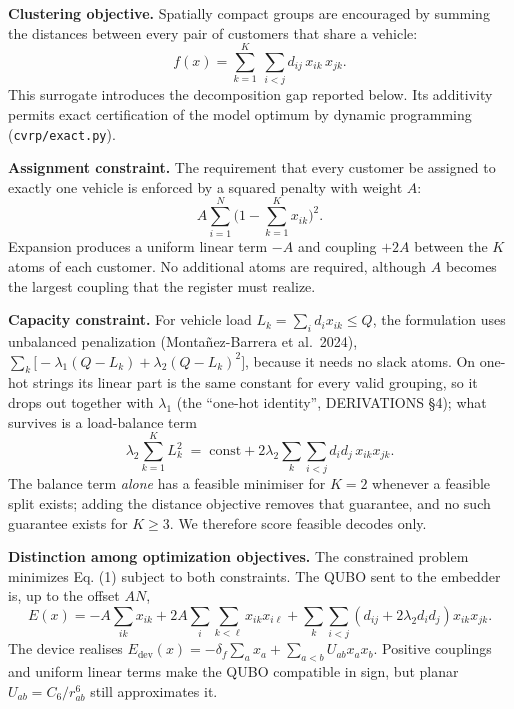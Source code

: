 \documentclass[9pt,a4paper]{extarticle}
\begin{document}
\textbf{Clustering objective.} Spatially compact groups are encouraged
by summing the distances between every pair of customers that share a
vehicle: \begin{equation}
f(x)=\sum_{k=1}^{K}\ \sum_{i<j} d_{ij}\,x_{ik}\,x_{jk}.
\end{equation} This surrogate introduces the decomposition gap reported
below. Its additivity permits exact certification of the model optimum
by dynamic programming (\texttt{cvrp/exact.py}).

\textbf{Assignment constraint.} The requirement that every customer be
assigned to exactly one vehicle is enforced by a squared penalty with
weight \(A\): \begin{equation}
A\sum_{i=1}^{N}\Big(1-\sum_{k=1}^{K}x_{ik}\Big)^2 .
\end{equation} Expansion produces a uniform linear term \(-A\) and
coupling \(+2A\) between the \(K\) atoms of each customer. No additional
atoms are required, although \(A\) becomes the largest coupling that the
register must realize.

\textbf{Capacity constraint.} For vehicle load
\(L_k=\sum_i d_i x_{ik}\le Q\), the formulation uses unbalanced
penalization (Montañez-Barrera et al.~2024),
\(\sum_k\big[-\lambda_1(Q-L_k)+\lambda_2(Q-L_k)^2\big]\), because it
needs no slack atoms. On one-hot strings its linear part is the same
constant for every valid grouping, so it drops out together with
\(\lambda_1\) (the ``one-hot identity'', DERIVATIONS §4); what survives
is a load-balance term \begin{equation}
\lambda_2\sum_{k=1}^{K} L_k^2 \;=\; \text{const}+2\lambda_2\sum_k\sum_{i<j} d_i d_j\,x_{ik}x_{jk}.
\end{equation} The balance term \emph{alone} has a feasible minimiser
for \(K=2\) whenever a feasible split exists; adding the distance
objective removes that guarantee, and no such guarantee exists for
\(K\ge3\). We therefore score feasible decodes only.

\textbf{Distinction among optimization objectives.} The constrained
problem minimizes Eq. (1) subject to both constraints. The QUBO sent to
the embedder is, up to the offset \(AN\), \begin{equation}
E(x)=-A\sum_{ik}x_{ik}+2A\sum_i\sum_{k<\ell}x_{ik}x_{i\ell}
+\sum_k\sum_{i<j}(d_{ij}+2\lambda_2d_id_j)x_{ik}x_{jk}.
\end{equation} The device realises
\(E_{\mathrm{dev}}(x)=-\delta_f\sum_a x_a+\sum_{a<b}U_{ab}x_ax_b\).
Positive couplings and uniform linear terms make the QUBO compatible in
sign, but planar \(U_{ab}=C_6/r_{ab}^6\) still approximates it.
\end{document}
